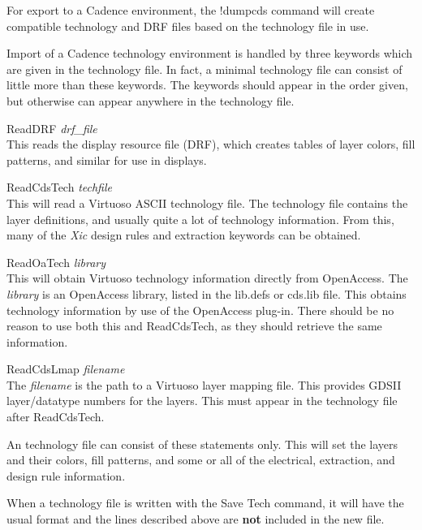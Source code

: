 For export to a Cadence environment, the {\cb !dumpcds} command will
create compatible technology and DRF files based on the {\Xic}
technology file in use.

Import of a Cadence technology environment is handled by three
keywords which are given in the {\Xic} technology file.  In fact, a
minimal technology file can consist of little more than these
keywords.  The keywords should appear in the order given, but
otherwise can appear anywhere in the {\Xic} technology file.

\begin{description}
\item{\vt ReadDRF} {\it drf\_file}\\
This reads the display resource file (DRF), which creates tables
of layer colors, fill patterns, and similar for use in displays.

\item{\vt ReadCdsTech} {\it techfile}\\
This will read a Virtuoso ASCII technology file.  The technology file
contains the layer definitions, and usually quite a lot of technology
information.  From this, many of the {\it Xic} design rules and
extraction keywords can be obtained.

\item{\vt ReadOaTech} {\it library}\\
This will obtain Virtuoso technology information directly from
OpenAccess.  The {\it library} is an OpenAccess library, listed in
the {\vt lib.defs} or {\vt cds.lib} file.  This obtains technology
information by use of the OpenAccess plug-in.  There should be no
reason to use both this and {\vt ReadCdsTech}, as they should
retrieve the same information.

\item{\vt ReadCdsLmap} {\it filename}\\
The {\it filename} is the path to a Virtuoso layer mapping file.  This
provides GDSII layer/datatype numbers for the layers.  This must
appear in the {\Xic} technology file after {\vt ReadCdsTech}.
\end{description}

An {\Xic} technology file can consist of these statements only.  This
will set the layers and their colors, fill patterns, and some or all
of the electrical, extraction, and design rule information.

When a technology file is written with the {\cb Save Tech} command, it
will have the usual format and the lines described above are {\bf not}
included in the new file.

